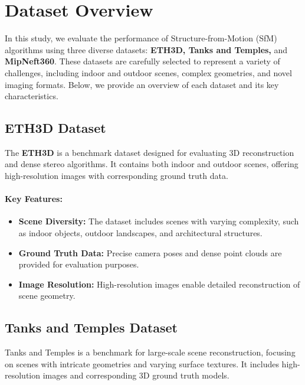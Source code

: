\section{Dataset Overview}\label{sec:datasets}

In this study, we evaluate the performance of Structure-from-Motion (SfM) algorithms using three diverse datasets: \textbf{ETH3D, Tanks and Temples,} and \textbf{MipNeft360}. 
These datasets are carefully selected to represent a variety of challenges, including indoor and outdoor scenes, complex geometries, and novel imaging formats. 
Below, we provide an overview of each dataset and its key characteristics.

\subsection{ETH3D Dataset}

The \textbf{ETH3D} \cite{Schops_2019_CVPR} is a benchmark dataset designed for evaluating 3D reconstruction and dense stereo algorithms. 
It contains both indoor and outdoor scenes, offering high-resolution images with corresponding ground truth data.

\paragraph{Key Features:}
\begin{itemize}
    \item \textbf{Scene Diversity:} The dataset includes scenes with varying complexity, such as indoor objects, outdoor landscapes, and architectural structures.
    \item \textbf{Ground Truth Data:} Precise camera poses and dense point clouds are provided for evaluation purposes.
    \item \textbf{Image Resolution:} High-resolution images enable detailed reconstruction of scene geometry.
\end{itemize}

\subsection{Tanks and Temples Dataset}

Tanks and Temples \cite{Knapitsch2017} is a benchmark for large-scale scene reconstruction, focusing on scenes with intricate geometries and varying surface textures. 
It includes high-resolution images and corresponding 3D ground truth models.

